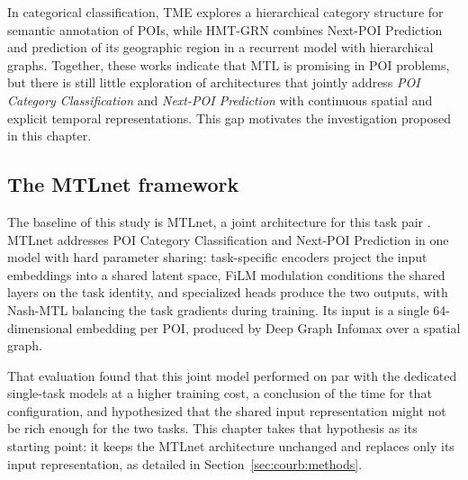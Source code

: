 In categorical classification, TME \cite{Xu2023} explores a hierarchical category structure for semantic annotation of POIs, while HMT-GRN \cite{Lim2022} combines Next-POI Prediction and prediction of its geographic region in a recurrent model with hierarchical graphs. Together, these works indicate that MTL is promising in POI problems, but there is still little exploration of architectures that jointly address \textit{POI Category Classification} and \textit{Next-POI Prediction} with continuous spatial and explicit temporal representations. This gap motivates the investigation proposed in this chapter.

\subsection{The MTLnet framework}
\label{sec:courb:mtlnet-recap}

The baseline of this study is MTLnet, a joint architecture for this task pair \cite{silva2025mtlnet}. MTLnet addresses POI Category Classification and Next-POI Prediction in one model with hard parameter sharing: task-specific encoders project the input embeddings into a shared latent space, FiLM modulation conditions the shared layers on the task identity, and specialized heads produce the two outputs, with Nash-MTL balancing the task gradients during training. Its input is a single 64-dimensional embedding per POI, produced by Deep Graph Infomax over a spatial graph.

That evaluation \cite{silva2025mtlnet} found that this joint model performed on par with the dedicated single-task models at a higher training cost, a conclusion of the time for that configuration, and hypothesized that the shared input representation might not be rich enough for the two tasks. This chapter takes that hypothesis as its starting point: it keeps the MTLnet architecture unchanged and replaces only its input representation, as detailed in Section~\ref{sec:courb:methods}.
